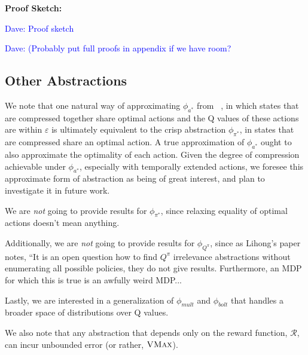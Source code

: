 \documentclass{article}
\newcommand\dnote[1]{\textcolor{blue}{Dave: #1}}
\begin{document}
{\bf Proof Sketch:}

\dnote{Proof sketch}


\dnote{(Probably put full proofs in appendix if we have room?}











\subsection{Other Abstractions}

We note that one natural way of approximating $\phi_{a^*}$ from ~\cite{li2006towards}, in which states that are compressed together share optimal actions and the Q values of these actions are within $\varepsilon$ is ultimately equivalent to the crisp abstraction $\phi_{\pi^*}$, in states that are compressed share an optimal action. A true approximation of $\phi_{a^*}$ ought to also approximate the optimality of each action. Given the degree of compression achievable under $\phi_{a^*}$, especially with temporally extended actions, we foresee this approximate form of abstraction as being of great interest, and plan to investigate it in future work.

We are {\it not} going to provide results for $\phi_{\pi^*}$, since relaxing equality of optimal actions doesn't mean anything.

Additionally, we are {\it not} going to provide results for $\phi_{Q^\pi}$, since as Lihong's paper notes, ``It is an open question how to find $Q^\pi$ irrelevance abstractions without enumerating all possible policies, they do not give results. Furthermore, an MDP for which this is true is an awfully weird MDP...

Lastly, we are interested in a generalization of $\phi_{mult}$  and $\phi_{bolt}$ that handles a broader space of distributions over Q values.

We also note that any abstraction that depends only on the reward function, $\mathcal{R}$, can incur unbounded error (or rather, $\textsc{VMax}$).
\end{document}
